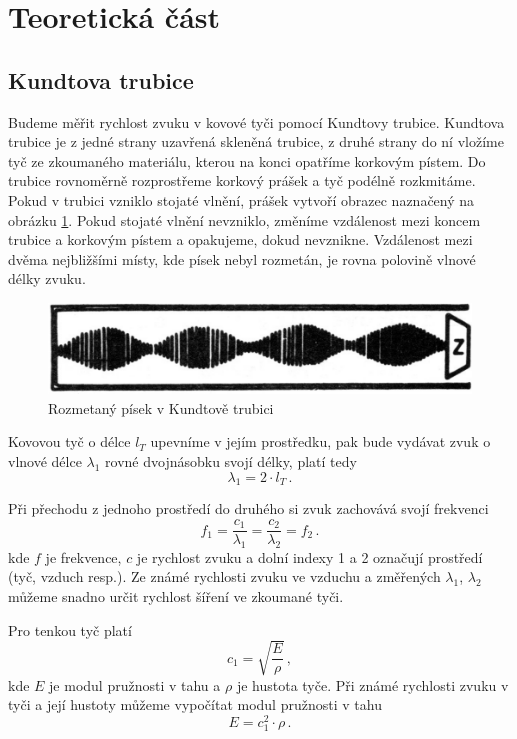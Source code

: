 \section*{Teoretická část}
\subsection*{Kundtova trubice}
Budeme měřit rychlost zvuku v kovové tyči pomocí Kundtovy trubice.
Kundtova trubice je z jedné strany uzavřená skleněná trubice, z druhé strany do ní vložíme tyč ze zkoumaného materiálu, kterou na konci opatříme korkovým pístem.
Do trubice rovnoměrně rozprostřeme korkový prášek a tyč podélně rozkmitáme.
Pokud v trubici vzniklo stojaté vlnění, prášek vytvoří obrazec naznačený na obrázku \ref{obr::obrazectrubice}.
Pokud stojaté vlnění nevzniklo, změníme vzdálenost mezi koncem trubice a korkovým pístem a opakujeme, dokud nevznikne.
Vzdálenost mezi dvěma nejbližšími místy, kde písek nebyl rozmetán, je rovna polovině vlnové délky zvuku.

\begin{figure}[htbp]
\centering
\includegraphics[width=\textwidth-10cm]{graficos/obr1}
\caption{Rozmetaný písek v Kundtově trubici}
\label{obr::obrazectrubice}
\end{figure}

Kovovou tyč o délce $l_T$ upevníme v jejím prostředku, pak bude vydávat zvuk o vlnové délce $\lambda_1$ rovné dvojnásobku svojí délky, platí tedy
\begin{equation} \label{eq::lambda1tyc}
\lambda_1=2 \cdot l_T  \,.
\end{equation}

Při přechodu z jednoho prostředí do druhého si zvuk zachovává svojí frekvenci
\begin{equation} \label{eq::kundt_rovnost_frekvenci}
f_1= \frac{c_1}{\lambda_1}=\frac{c_2}{\lambda_2}=f_2 \,.
\end{equation}
kde $f$ je frekvence, $c$ je rychlost zvuku a dolní indexy 1 a 2 označují prostředí (tyč, vzduch resp.).
Ze známé rychlosti zvuku ve vzduchu a změřených $\lambda_1$, $\lambda_2$ můžeme snadno určit rychlost šíření ve zkoumané tyči.

Pro tenkou tyč platí \cite{ZFP}
\begin{equation}
c_1 = \sqrt{ \frac{E}{\rho}  } \,,
\end{equation}
kde $E$ je modul pružnosti v tahu a $\rho$ je hustota tyče.
Při známé rychlosti zvuku v tyči a její hustoty můžeme vypočítat modul pružnosti v tahu
\begin{equation} \label{eq::modulpruznosti}
E=c_1^2 \cdot \rho \,.
\end{equation}

